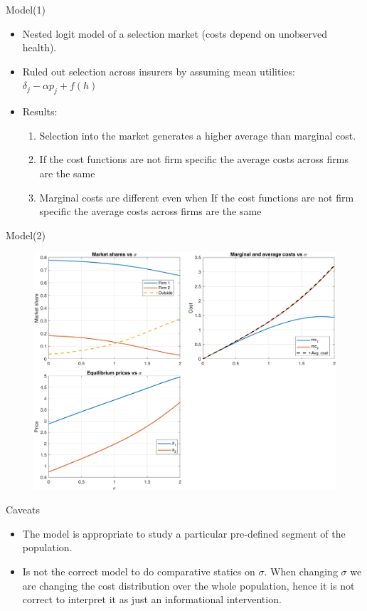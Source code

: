 \documentclass[10pt,aspectratio=169]{beamer}
\begin{document}
\begin{frame}{Model(1)}
\begin{itemize}
    \item Nested logit model of a selection market (costs depend on unobserved health). 
    \item Ruled out selection across insurers by assuming mean utilities: $\delta_j - \alpha p_j + f(h)$
    \item Results: 
    \begin{enumerate}
        \item Selection into the market generates a higher average than marginal cost. 
        \item If the cost functions are not firm specific the average costs across firms are the same 
        \item Marginal costs are different even when 
        If the cost functions are not firm specific the average costs across firms are the same 
    \end{enumerate}
\end{itemize}
\end{frame}


\begin{frame}{Model(2)}
 \begin{figure}
     \centering
     \includegraphics[width=0.6\linewidth]{figures/simulations/sigma_panels_2firms.png}
     \label{fig:placeholder}
 \end{figure}
\end{frame}

\begin{frame}{Caveats}
\begin{itemize}
    \item The model is appropriate to study  a particular pre-defined segment of the population.
    \item Is not the correct model to do comparative statics on $\sigma$. When changing $\sigma$ we are changing the cost distribution over the whole population, hence it is not correct to interpret it as just an informational intervention. 
\end{itemize}


\end{frame}



 
\end{document}
